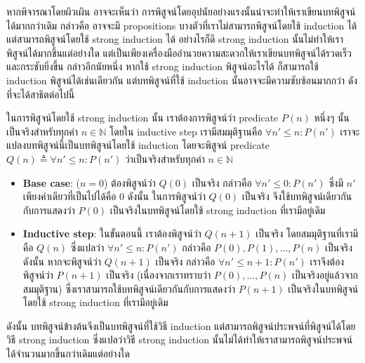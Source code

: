 หากพิจารณาโดยผิวเผิน อาจจะเห็นว่า การพิสูจน์โดยอุปนัยอย่างแรงนั้นน่าจะทำให้เราเขียนบทพิสูจน์ได้มากกว่าเดิม กล่าวคือ อาจจะมี propositions บางตัวที่เราไม่สามารถพิสูจน์โดยใช้ induction ได้ แต่สามารถพิสูจน์โดยใช้ strong induction ได้ อย่างไรก็ดี strong induction นั้นไม่ทำให้เราพิสูจน์ได้มากขึ้นแต่อย่างใด แต่เป็นเพียงเครื่องมืออำนวยความสะดวกให้เราเขียนบทพิสูจน์ได้รวดเร็วและกระชับยิ่งขึ้น \enskip กล่าวอีกนัยหนึ่ง หากใช้ strong induction พิสูจน์อะไรได้ ก็สามารถใช้ induction พิสูจน์ได้เช่นเดียวกัน แต่บทพิสูจน์ที่ใช้ induction นั้นอาจจะมีความซับซ้อนมากกว่า ดังที่จะได้สาธิตต่อไปนี้

ในการพิสูจน์โดยใช้ strong induction นั้น เราต้องการพิสูจน์ว่า predicate $P(n)$ หนึ่งๆ นั้นเป็นจริงสำหรับทุกค่า $n\in\mathbb{N}$ โดยใน inductive step เรามีสมมุติฐานคือ $\forall n'\leq n: P(n')$ \enskip เราจะแปลงบทพิสูจน์นี้เป็นบทพิสูจน์โดยใช้ induction โดยจะพิสูจน์ predicate $Q(n)\triangleq\forall n'\leq n: P(n')$ ว่าเป็นจริงสำหรับทุกค่า $n\in\mathbb{N}$
\begin{itemize}
\item {\bf Base case}: ($n=0$) \quad ต้องพิสูจน์ว่า $Q(0)$ เป็นจริง กล่าวคือ $\forall n'\leq 0: P(n')$ ซึ่งมี $n'$ เพียงค่าเดียวที่เป็นไปได้คือ $0$ \enskip ดังนั้น ในการพิสูจน์ว่า $Q(0)$ เป็นจริง จึงใช้บทพิสูจน์เดียวกันกับการแสดงว่า $P(0)$ เป็นจริงในบทพิสูจน์โดยใช้ strong induction ที่เรามีอยู่เดิม
\item {\bf Inductive step}: ในขั้นตอนนี้ เราต้องพิสูจน์ว่า $Q(n+1)$ เป็นจริง โดยสมมุติฐานที่เรามีคือ $Q(n)$ ซึ่งแปลว่า $\forall n'\leq n: P(n')$ กล่าวคือ $P(0),P(1),\ldots,P(n)$ เป็นจริง \enskip ดังนั้น หากจะพิสูจน์ว่า $Q(n+1)$ เป็นจริง กล่าวคือ $\forall n'\leq n+1: P(n')$ เราจึงต้องพิสูจน์ว่า $P(n+1)$ เป็นจริง (เนื่องจากเราทราบว่า $P(0),\ldots,P(n)$ เป็นจริงอยู่แล้วจากสมมุติฐาน) ซึ่งเราสามารถใช้บทพิสูจน์เดียวกันกับการแสดงว่า $P(n+1)$ เป็นจริงในบทพิสูจน์โดยใช้ strong induction ที่เรามีอยู่เดิม
\end{itemize}
ดังนั้น บทพิสูจน์ข้างต้นจึงเป็นบทพิสูจน์ที่ใช้วิธี induction แต่สามารถพิสูจน์ประพจน์ที่พิสูจน์ได้โดยวิธี strong induction ซึ่งแปลว่าวิธี strong induction นั้นไม่ได้ทำให้เราสามารถพิสูจน์ประพจน์ได้จำนวนมากขึ้นกว่าเดิมแต่อย่างใด
